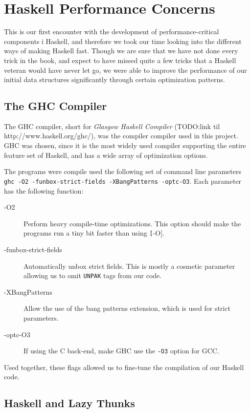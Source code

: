 \section{Haskell Performance Concerns}

This is our first encounter with the development of performance-critical components i Haskell, and therefore we took our time looking into the different ways of making Haskell fast. Though we are sure that we have not done every trick in the book, and expect to have missed quite a few tricks that a Haskell veteran would have never let go, we were able to improve the performance of our initial data structures significantly through certain optimization patterns.

\subsection{The GHC Compiler}
The GHC compiler, short for \textit{Glasgow Haskell Compiler} (TODO:link til http://www.haskell.org/ghc/), was the compiler compiler used  in this project. GHC was chosen, since it is the most widely used compiler supporting the entire feature set of Haskell, and has a wide array of optimization options.

The programs were compile used the following set of command line parameters \texttt{ghc -O2 -funbox-strict-fields -XBangPatterns -optc-O3}. Each parameter has the following function:
\begin{description}
\item[-O2] Perform heavy compile-time optimizations. This option should make the programs run a tiny bit faster than using \texttt[-O].
\item[-funbox-strict-fields] Automatically unbox strict fields. This is mostly a cosmetic parameter allowing us to omit \texttt{UNPAK} tags from our code.
\item[-XBangPatterns] Allow the use of the bang patterns extension, which is used for strict parameters.
\item[-optc-O3] If using the C back-end, make GHC use the \texttt{-O3} option for GCC.
\end{description}

Used together, these flags allowed us to fine-tune the compilation of our Haskell code.

\subsection{Haskell and Lazy Thunks}

